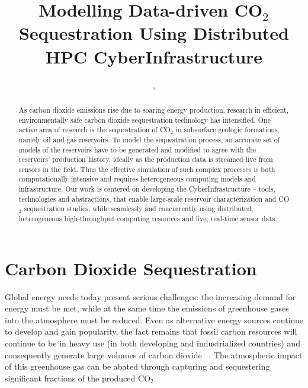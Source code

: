 \documentclass[10pt,conference,final]{IEEEtran}
\begin{document}
\title{Modelling Data-driven CO$_{2}$ Sequestration Using Distributed HPC CyberInfrastructure}

 \author{,
    }


\maketitle

\begin{abstract} As carbon dioxide emissions rise due to soaring energy production, research in efficient, environmentally safe carbon dioxide sequestration technology has intensified.  One active area of research is the sequestration of CO$_2$ in subsurface geologic formations, namely oil and gas reservoirs. To model the sequestration process, an accurate set of models of the reservoirs have to be generated and modified to agree with the reservoirs' production history, ideally as the production data is streamed live from sensors in the field. Thus the effective simulation of such complex processes is both computationally intensive and requires heterogeneous computing models and infrastructure.  Our work is centered on developing the CyberInfrastructure -- tools, technologies and abstractions, that enable large-scale reservoir characterization and CO$_2$ sequestration studies, %
while seamlessly and concurrently using distributed, heterogeneous high-throughput computing resources and live, real-time sensor data.  
\end{abstract}


\section*{Carbon Dioxide Sequestration}
Global energy needs today present serious challenges: the increasing demand for energy 
must be met, while at the same time the 
emissions of greenhouse gases into the atmosphere must be reduced.
Even as alternative energy sources continue to develop and gain 
popularity, the fact remains that fossil carbon resources will continue to be in heavy use 
(in both developing and industrialized countries) and consequently generate 
large volumes of carbon dioxide ~\cite{GeoRPT}. The atmospheric impact of this greenhouse gas 
can be abated through capturing and sequestering significant fractions of the produced 
CO$_2$.
\end{document}

